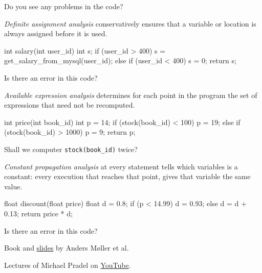 \documentclass{article}
\begin{document}
Do you see any problems in the code?

\plush{}


\emph{Definite assignment analysis} conservatively ensures that a variable or location is always assigned before it is used.

{\small
\begin{ffcode}
int salary(int user_id) {
  int s;
  if (user_id > 400) {
    s = get_salary_from_mysql(user_id);
  } else if (user_id < 400) {
    s = 0;
  }
  return s;
}
\end{ffcode}
}

Is there an error in this code?

\plush{}


\emph{Available expression analysis} determines for each point in the program the set of expressions that need not be recomputed.

{\small
\begin{ffcode}
int price(int book_id) {
  int p = 14;
  if (stock(book_id) < 100) {
    p = 19;
  } else if (stock(book_id) > 1000) {
    p = 9;
  }
  return p;
}
\end{ffcode}
}

Shall we computer \texttt{stock(book\_id)} twice?

\plush{}


\emph{Constant propagation analysis} at every statement tells which variables is a constant:
every execution that reaches that point, gives that variable the same value.

{\small
\begin{ffcode}
float discount(float price) {
  float d = 0.8;
  if (p < 14.99)
    d = 0.93;
  else
    d = d + 0.13;
  return price * d;
}
\end{ffcode}
}

Is there an error in this code?

\plush{}


Book and \href{http://cs.au.dk/~amoeller/spa/}{slides} by Anders M\o{}ller et al.

Lectures of Michael Pradel on \href{https://www.youtube.com/watch?v=rJYgTJaXZU0}{YouTube}.
\end{document}
